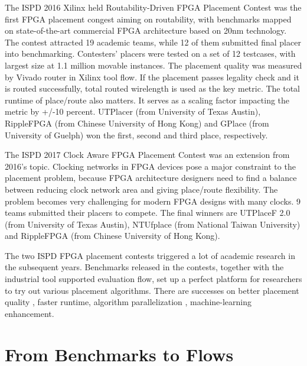 \documentclass[sigconf]{acmart}
\begin{document}
The ISPD 2016 Xilinx held Routability-Driven FPGA Placement Contest
\cite{sy1} was the first FPGA placement congest aiming on routability,
with benchmarks mapped on state-of-the-art commercial FPGA
architecture based on 20nm technology. The contest attracted 19
academic teams, while 12 of them submitted final placer into
benchmarking. Contesters' placers were tested on a set of 12
testcases, with largest size at 1.1 million movable instances. The
placement quality was measured by Vivado router in Xilinx tool flow. If
the placement passes legality check and it is routed successfully,
total routed wirelength is used as the key metric. The total runtime
of place/route also matters. It serves as a scaling factor impacting
the metric by +/-10 percent.  UTPlacer\cite{sy2}  (from University of Texas
Austin), RippleFPGA\cite{sy3}  (from Chinese University of Hong Kong) and
GPlace\cite{sy4}  (from University of Guelph) won the first, second and third
place, respectively.

The ISPD 2017 Clock Aware FPGA Placement Contest\cite{sy5} was an
extension from 2016's topic. Clocking networks in FPGA devices pose a
major constraint to the placement problem, because FPGA architecture
designers need to find a balance between reducing clock network area
and giving place/route flexibility. The problem becomes very
challenging for modern FPGA designs with many clocks. 9 teams
submitted their placers to compete. The final winners are UTPlaceF 2.0
\cite{sy6} (from University of Texas Austin), NTUfplace\cite{sy7} (from National
Taiwan University) and RippleFPGA\cite{sy8}  (from Chinese University of Hong
Kong).

The two ISPD FPGA placement contests triggered a lot of academic research
in the subsequent years. Benchmarks released in the contests, together
with the industrial tool supported evaluation flow, set up a perfect
platform for researchers to try out various placement
algorithms. There are successes on better placement quality\cite{sy9} ,
faster runtime, algorithm parallelization\cite{sy10,sy11} , machine-learning
enhancement\cite{sy12}.



\iffalse
\subsection{Deep Learning Accelerator Placement, 2020}

Include this?  Not really placement, but placement-ish?
\fi


\section{From Benchmarks to Flows}
\end{document}
